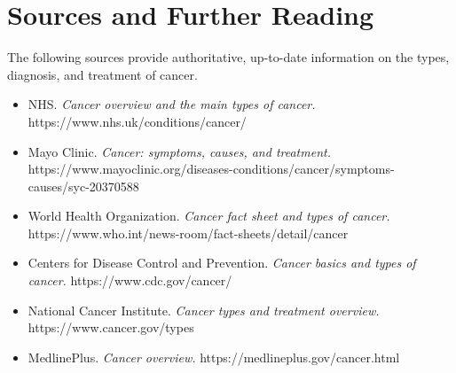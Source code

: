 \section*{Sources and Further Reading}
The following sources provide authoritative, up-to-date information on the types, diagnosis, and treatment of cancer.
\begin{itemize}
    \item NHS. \textit{Cancer overview and the main types of cancer.} https://www.nhs.uk/conditions/cancer/
    \item Mayo Clinic. \textit{Cancer: symptoms, causes, and treatment.} https://www.mayoclinic.org/diseases-conditions/cancer/symptoms-causes/syc-20370588
    \item World Health Organization. \textit{Cancer fact sheet and types of cancer.} https://www.who.int/news-room/fact-sheets/detail/cancer
    \item Centers for Disease Control and Prevention. \textit{Cancer basics and types of cancer.} https://www.cdc.gov/cancer/
    \item National Cancer Institute. \textit{Cancer types and treatment overview.} https://www.cancer.gov/types
    \item MedlinePlus. \textit{Cancer overview.} https://medlineplus.gov/cancer.html
\end{itemize}
